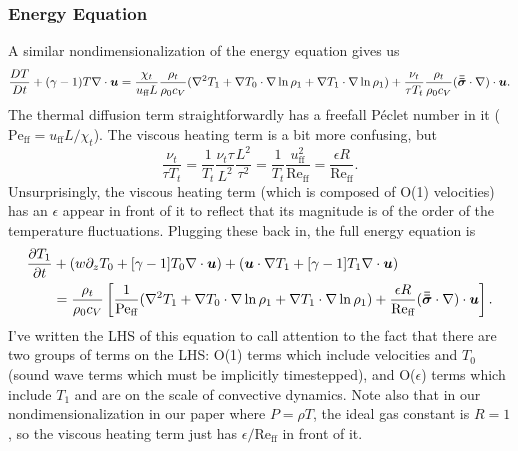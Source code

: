 \subsubsection{Energy Equation}
A similar nondimensionalization of the energy equation gives us
\begin{equation}
\frac{D T}{D t} + (\gamma-1)T \nabla\cdot\bm{u} = 
\frac{\chi_t}{u_{\text{ff}} L}\frac{\rho_t}{\rho_0 c_V} (\nabla^2 T_1 + \nabla T_0\cdot\nabla\ln\rho_1 + \nabla T_1\cdot\nabla\ln\rho_1)
+ \frac{\nu_t}{\tau T_t}\frac{\rho_t}{\rho_0 c_V} (\bm{\bar{\bar{\sigma}}}\cdot\nabla)\cdot\bm{u}.
\end{equation}
The thermal diffusion term straightforwardly has a freefall P\'{e}clet number in it ($\text{Pe}_{\text{ff}} = u_{\text{ff}} L / \chi_t$).
The viscous heating term is a bit more confusing, but
$$
\frac{\nu_t}{\tau T_t} = \frac{1}{T_t}\frac{\nu_t \tau}{L^2} \frac{L^2}{\tau^2} = \frac{1}{T_t}\frac{u_{\text{ff}}^2}{\text{Re}_{\text{ff}}} = \frac{\epsilon R}{\text{Re}_{\text{ff}}}.
$$
Unsurprisingly, the viscous heating term (which is composed of O(1) velocities) has an $\epsilon$ appear in front of it to reflect that its magnitude is of the order of the temperature fluctuations.
Plugging these back in, the full energy equation is
\begin{equation}
\begin{split}
\frac{\partial T_1}{\partial t} &+ (w \partial_z T_0 + [\gamma-1]T_0\nabla\cdot\bm{u}) + (\bm{u}\cdot\nabla T_1 + [\gamma-1] T_1\nabla\cdot\bm{u})
\\
&= \frac{\rho_t}{\rho_0 c_V}\left[
\frac{1}{\text{Pe}_{\text{ff}}}(\nabla^2 T_1 + \nabla T_0 \cdot\nabla\ln\rho_1 + \nabla T_1 \cdot\nabla\ln\rho_1)
+ \frac{\epsilon R}{\text{Re}_{\text{ff}}} (\bm{\bar{\bar{\sigma}}}\cdot\nabla)\cdot\bm{u}
\right].
\end{split}
\end{equation}
I've written the LHS of this equation to call attention to the fact that there are two groups of terms on the LHS: O(1) terms which include velocities and $T_0$ (sound wave terms which must be implicitly timestepped), and O($\epsilon$) terms which include $T_1$ and are on the scale of convective dynamics.
Note also that in our nondimensionalization in our paper where $P = \rho T$, the ideal gas constant is $R = 1$, so the viscous heating term just has $\epsilon/\text{Re}_{\text{ff}}$ in front of it.



